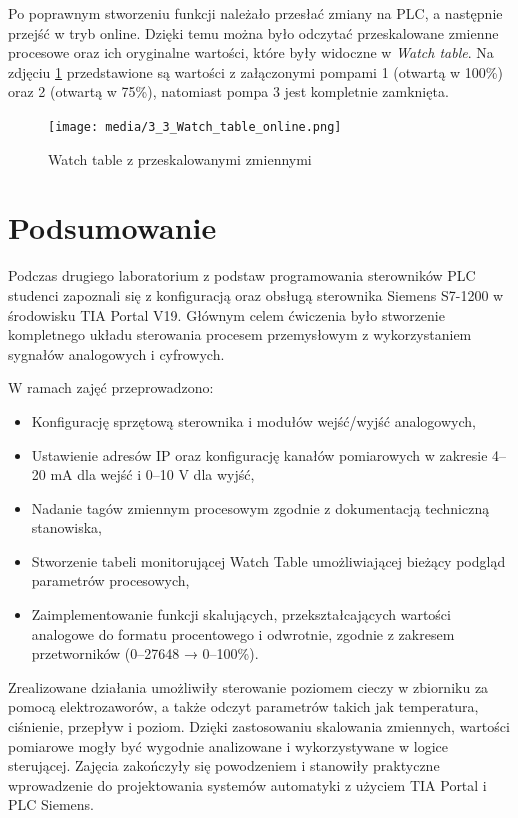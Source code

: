 \documentclass{article}
\begin{document}
Po poprawnym stworzeniu funkcji należało przesłać zmiany na PLC, a następnie przejść w tryb online. Dzięki temu można było odczytać przeskalowane zmienne procesowe oraz ich oryginalne wartości, które były widoczne w \textit{Watch table}. Na zdjęciu \ref{fig:zdj14} przedstawione są wartości z załączonymi pompami 1 (otwartą w 100\%) oraz 2 (otwartą w 75\%), natomiast pompa 3 jest kompletnie zamknięta.
\begin{figure}[H]
    \centering
    \texttt{[image: media/3\_3\_Watch\_table\_online.png]}
    \caption{Watch table z przeskalowanymi zmiennymi}
    \label{fig:zdj14}
\end{figure}

\newpage
\section{Podsumowanie}
Podczas drugiego laboratorium z podstaw programowania sterowników PLC studenci zapoznali się z konfiguracją oraz obsługą sterownika Siemens S7-1200 w środowisku TIA Portal V19. Głównym celem ćwiczenia było stworzenie kompletnego układu sterowania procesem przemysłowym z wykorzystaniem sygnałów analogowych i cyfrowych.

W ramach zajęć przeprowadzono:
\begin{itemize}
    \item Konfigurację sprzętową sterownika i modułów wejść/wyjść analogowych,
    \item Ustawienie adresów IP oraz konfigurację kanałów pomiarowych w zakresie 4–20 mA dla wejść i 0–10 V dla wyjść,
    \item Nadanie tagów zmiennym procesowym zgodnie z dokumentacją techniczną stanowiska,
    \item Stworzenie tabeli monitorującej Watch Table umożliwiającej bieżący podgląd parametrów procesowych,
    \item 
    Zaimplementowanie funkcji skalujących, przekształcających wartości analogowe do formatu procentowego i odwrotnie, zgodnie z zakresem przetworników (0–27648 → 0–100\%).
\end{itemize}

Zrealizowane działania umożliwiły sterowanie poziomem cieczy w zbiorniku za pomocą elektrozaworów, a także odczyt parametrów takich jak temperatura, ciśnienie, przepływ i poziom. Dzięki zastosowaniu skalowania zmiennych, wartości pomiarowe mogły być wygodnie analizowane i wykorzystywane w logice sterującej. Zajęcia zakończyły się powodzeniem i stanowiły praktyczne wprowadzenie do projektowania systemów automatyki z użyciem TIA Portal i PLC Siemens.
\end{document}
